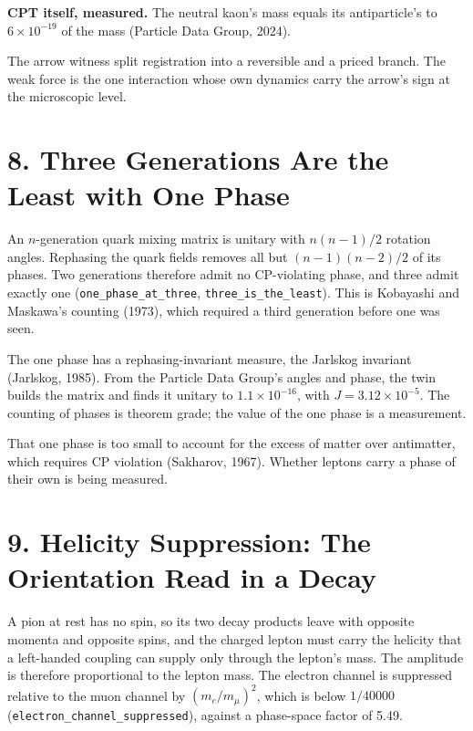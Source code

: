 \documentclass[10pt]{article}
\begin{document}
\textbf{CPT itself, measured.} The neutral kaon's mass equals its
antiparticle's to \(6\times10^{-19}\) of the mass (Particle Data Group,
2024).

The arrow witness split registration into a reversible and a priced
branch. The weak force is the one interaction whose own dynamics carry
the arrow's sign at the microscopic level.

\hypertarget{three-generations-are-the-least-with-one-phase}{%
\section{8. Three Generations Are the Least with One
Phase}\label{three-generations-are-the-least-with-one-phase}}

An \(n\)-generation quark mixing matrix is unitary with \(n(n-1)/2\)
rotation angles. Rephasing the quark fields removes all but
\((n-1)(n-2)/2\) of its phases. Two generations therefore admit no
CP-violating phase, and three admit exactly one
(\texttt{one\_phase\_at\_three}, \texttt{three\_is\_the\_least}). This
is Kobayashi and Maskawa's counting (1973), which required a third
generation before one was seen.

The one phase has a rephasing-invariant measure, the Jarlskog invariant
(Jarlskog, 1985). From the Particle Data Group's angles and phase, the
twin builds the matrix and finds it unitary to \(1.1\times10^{-16}\),
with \(J=3.12\times10^{-5}\). The counting of phases is theorem grade;
the value of the one phase is a measurement.

That one phase is too small to account for the excess of matter over
antimatter, which requires CP violation (Sakharov, 1967). Whether
leptons carry a phase of their own is being measured.

\hypertarget{helicity-suppression-the-orientation-read-in-a-decay}{%
\section{9. Helicity Suppression: The Orientation Read in a
Decay}\label{helicity-suppression-the-orientation-read-in-a-decay}}

A pion at rest has no spin, so its two decay products leave with
opposite momenta and opposite spins, and the charged lepton must carry
the helicity that a left-handed coupling can supply only through the
lepton's mass. The amplitude is therefore proportional to the lepton
mass. The electron channel is suppressed relative to the muon channel by
\((m_e/m_\mu)^2\), which is below \(1/40000\)
(\texttt{electron\_channel\_suppressed}), against a phase-space factor
of 5.49.
\end{document}
